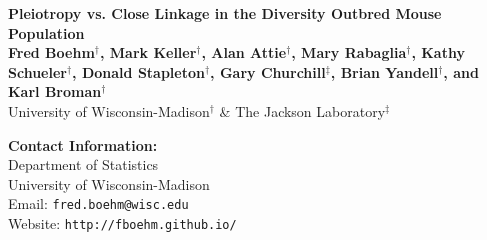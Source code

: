 \documentclass[a0,landscape]{a0poster}
\begin{document}


\begin{minipage}[b]{0.75\linewidth}
\veryHuge \color{NavyBlue} \textbf{Pleiotropy vs. Close Linkage in the Diversity Outbred Mouse Population} \color{Black}\\ %
\huge \textbf{Fred Boehm$^{\dagger}$, Mark Keller$^{\dagger}$, Alan Attie$^{\dagger}$, Mary Rabaglia$^{\dagger}$, Kathy Schueler$^{\dagger}$, Donald Stapleton$^{\dagger}$, Gary Churchill$^{\ddagger}$, Brian Yandell$^{\dagger}$, and Karl Broman$^{\dagger}$}\\ %
\huge University of Wisconsin-Madison$^{\dagger}$ \& The Jackson Laboratory$^{\ddagger}$\\ %
\end{minipage}
%
\hspace{8cm}
\begin{minipage}[b]{0.2\linewidth}
\color{DarkSlateGray}\Large \textbf{Contact Information:}\\
Department of Statistics\\ %
University of Wisconsin-Madison\\
Email: \texttt{fred.boehm@wisc.edu}\\ %
Website: \texttt{http://fboehm.github.io/}
\end{minipage}
%

\vspace{1cm} %

\end{document}
